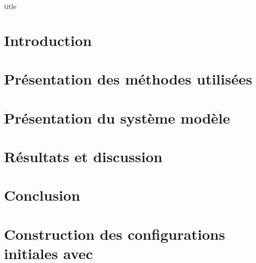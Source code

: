 \documentclass[a4paper, 11pt]{article}
\begin{document}
    {title}
\clearpage


\tableofcontents
\thispagestyle{empty}
\clearpage


\setcounter{page}{1}
\section*{Introduction}

    
\clearpage

\section{Présentation des méthodes utilisées}

    
\clearpage


\section{Présentation du système modèle} \label{sec:systeme_modele}

    
\clearpage


\section{Résultats et discussion}

    
\clearpage
    
\clearpage


\section{Conclusion}

    

\clearpage


\appendix
{}
\section{Construction des configurations initiales avec \packmol{}} \label{apdx:packmol}
\end{document}
